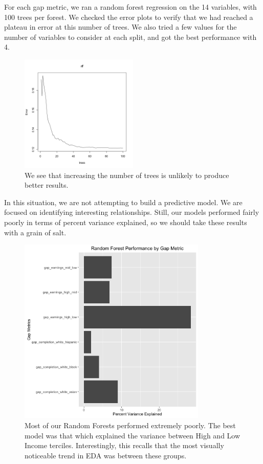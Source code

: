 \documentclass{article}
\begin{document}
For each gap metric, we ran a random forest regression on the 14 variables, with 100 trees per forest. We checked the error plots to verify that we had reached a plateau in error at this number of trees. We also tried a few values for the number of variables to consider at each split, and got the best performance with 4.

\begin{figure}[H]
\centering
\includegraphics[width=0.5\textwidth]{../images/rf_treesgap_completion_white_black.png}
\caption{\label{fig: WBRFerror} We see that increasing the number of trees is unlikely to produce better results.}
\end{figure}

In this situation, we are not attempting to build a predictive model. We are focused on identifying interesting relationships. Still, our models performed fairly poorly in terms of percent variance explained, so we should take these results with a grain of salt.

\begin{figure}[H]
\centering
\includegraphics[width=0.8\textwidth]{../images/rf_performance.png}
\caption{\label{fig: RFPerforomance} Most of our Random Forests performed extremely poorly. The best model was that which explained the variance between High and Low Income terciles. Interestingly, this recalls that the most visually noticeable trend in EDA was between these groups.}
\end{figure}
\end{document}
